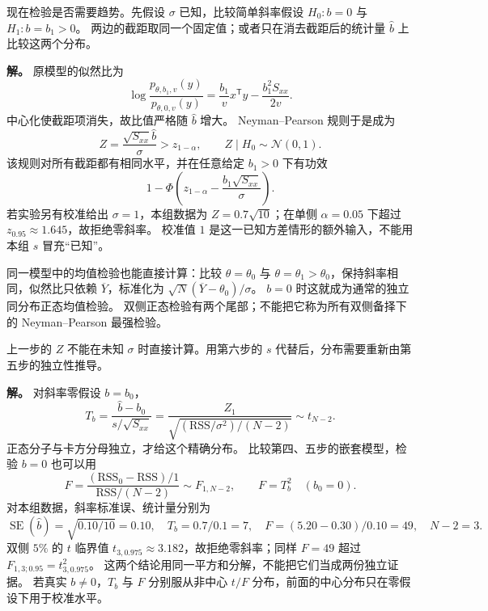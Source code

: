 \begin{exbox}
现在检验是否需要趋势。先假设 $\sigma$ 已知，比较简单斜率假设 $H_0:b=0$ 与 $H_1:b=b_1>0$。
两边的截距取同一个固定值；或者只在消去截距后的统计量 $\widehat b$ 上比较这两个分布。

\textbf{解。} 原模型的似然比为
\[
 \log\frac{p_{\theta,b_1,v}(y)}{p_{\theta,0,v}(y)}
 =\frac{b_1}{v}x^{\mathsf T}y-\frac{b_1^2S_{xx}}{2v}.
\]
中心化使截距项消失，故比值严格随 $\widehat b$ 增大。
Neyman--Pearson 规则于是成为
\[
 Z=\frac{\sqrt{S_{xx}}\widehat b}\sigma>z_{1-\alpha},
 \qquad Z\mid H_0\sim\mathcal N(0,1).
\]
该规则对所有截距都有相同水平，并在任意给定 $b_1>0$ 下有功效
\[
 1-\Phi\left(z_{1-\alpha}-\frac{b_1\sqrt{S_{xx}}}\sigma\right).
\]
若实验另有校准给出 $\sigma=1$，本组数据为 $Z=0.7\sqrt{10}$；在单侧 $\alpha=0.05$ 下超过 $z_{0.95}\approx1.645$，故拒绝零斜率。
校准值 $1$ 是这一已知方差情形的额外输入，不能用本组 $s$ 冒充“已知”。

同一模型中的均值检验也能直接计算：比较 $\theta=\theta_0$ 与 $\theta=\theta_1>\theta_0$，保持斜率相同，似然比只依赖 $\overline Y$，标准化为 $\sqrt N(\overline Y-\theta_0)/\sigma$。
$b=0$ 时这就成为通常的独立同分布正态均值检验。
双侧正态检验有两个尾部；不能把它称为所有双侧备择下的 Neyman--Pearson 最强检验。
\end{exbox}

\begin{exbox}[未知方差下的精确 $t/F$ 检验]
上一步的 $Z$ 不能在未知 $\sigma$ 时直接计算。用第六步的 $s$ 代替后，分布需要重新由第五步的独立性推导。

\textbf{解。} 对斜率零假设 $b=b_0$，
\[
 T_b=\frac{\widehat b-b_0}{s/\sqrt{S_{xx}}}
 =\frac{Z_1}{\sqrt{(\mathrm{RSS}/\sigma^2)/(N-2)}}
 \sim t_{N-2}.
\]
正态分子与卡方分母独立，才给这个精确分布。
比较第四、五步的嵌套模型，检验 $b=0$ 也可以用
\[
 F=\frac{(\mathrm{RSS}_0-\mathrm{RSS})/1}{\mathrm{RSS}/(N-2)}
 \sim F_{1,N-2},\qquad F=T_b^2\quad(b_0=0).
\]
对本组数据，斜率标准误、统计量分别为
\[
 \operatorname{SE}(\widehat b)=\sqrt{0.10/10}=0.10,
 \quad T_b=0.7/0.1=7,
 \quad F=(5.20-0.30)/0.10=49,
 \quad N-2=3.
\]
双侧 $5\%$ 的 $t$ 临界值 $t_{3,0.975}\approx3.182$，故拒绝零斜率；同样 $F=49$ 超过 $F_{1,3;0.95}=t_{3,0.975}^2$。
这两个结论用同一平方和分解，不能把它们当成两份独立证据。
若真实 $b\ne0$，$T_b$ 与 $F$ 分别服从非中心 $t/F$ 分布，前面的中心分布只在零假设下用于校准水平。
\end{exbox}

